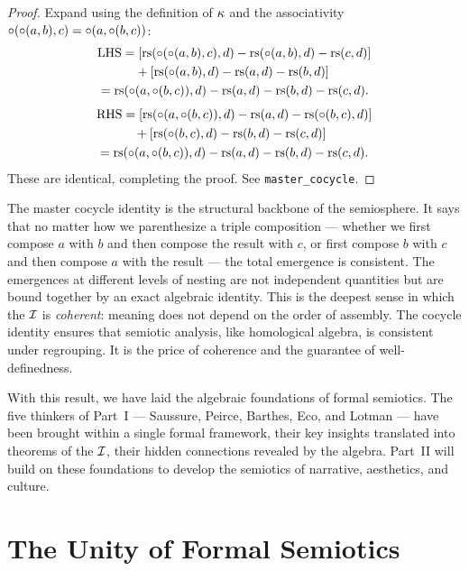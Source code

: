 \begin{proof}
Expand using the definition of $\kappa$ and the associativity
$\circ(\circ(a, b), c) = \circ(a, \circ(b, c))$:
\begin{align*}
  &\text{LHS} = [\mathrm{rs}(\circ(\circ(a,b),c), d) - \mathrm{rs}(\circ(a,b), d) - \mathrm{rs}(c, d)] \\
  &\qquad\quad + [\mathrm{rs}(\circ(a,b), d) - \mathrm{rs}(a, d) - \mathrm{rs}(b, d)] \\
  &= \mathrm{rs}(\circ(a, \circ(b,c)), d) - \mathrm{rs}(a, d) - \mathrm{rs}(b, d) - \mathrm{rs}(c, d).
\end{align*}
\begin{align*}
  &\text{RHS} = [\mathrm{rs}(\circ(a, \circ(b,c)), d) - \mathrm{rs}(a, d) - \mathrm{rs}(\circ(b,c), d)] \\
  &\qquad\quad + [\mathrm{rs}(\circ(b,c), d) - \mathrm{rs}(b, d) - \mathrm{rs}(c, d)] \\
  &= \mathrm{rs}(\circ(a, \circ(b,c)), d) - \mathrm{rs}(a, d) - \mathrm{rs}(b, d) - \mathrm{rs}(c, d).
\end{align*}
These are identical, completing the proof. See
\texttt{master\_cocycle}.
\end{proof}

\begin{interpretation}
The master cocycle identity is the structural backbone of the
semiosphere. It says that no matter how we parenthesize a triple
composition --- whether we first compose $a$ with $b$ and then
compose the result with $c$, or first compose $b$ with $c$ and
then compose $a$ with the result --- the total emergence is
consistent. The emergences at different levels of nesting are not
independent quantities but are bound together by an exact algebraic
identity. This is the deepest sense in which the $\mathcal{I}$ is
\emph{coherent}: meaning does not depend on the order of assembly.
The cocycle identity ensures that semiotic analysis, like homological
algebra, is consistent under regrouping. It is the price of coherence
and the guarantee of well-definedness.

With this result, we have laid the algebraic foundations of formal
semiotics. The five thinkers of Part~I --- Saussure, Peirce, Barthes,
Eco, and Lotman --- have been brought within a single formal framework,
their key insights translated into theorems of the $\mathcal{I}$, their
hidden connections revealed by the algebra. Part~II will build on
these foundations to develop the semiotics of narrative, aesthetics,
and culture.
\end{interpretation}

\section{The Unity of Formal Semiotics}

